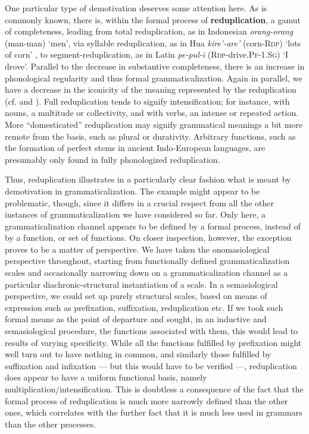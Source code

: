 One particular type of demotivation deserves some attention here. As is commonly known, there is, within the formal process of \textbf{reduplication}, a gamut of completeness, leading from total reduplication, as in Indonesian \textit{orang-orang} (man-man) ‘men’, via syllable reduplication, as in Hua \textit{kire'-are'} (corn-\textsc{Rdp}) ‘lots of corn’ \citep[222]{Haiman1980}, to segment-reduplication, as in Latin \textit{pe-pul-i} (\textsc{Rdp}{}-drive.\textsc{Pf-1.Sg}) ‘I drove’. Parallel to the decrease in substantive completeness, there is an increase in phonological regularity and thus formal grammaticalization. Again in parallel, we have a decrease in the iconicity of the meaning represented by the reduplication (cf. \citet{André1978} and \citet[46-48]{HeineEtAl1984} ). Full reduplication tends to signify intensification; for instance, with nouns, a multitude or collectivity, and with verbs, an intense or repeated action. More “domesticated” reduplication may signify grammatical meanings a bit more remote from the basis, such as plural or durativity. Arbitrary functions, such as the formation of perfect stems in ancient Indo-European languages, are presumably only found in fully phonologized reduplication.

Thus, reduplication illustrates in a particularly clear fashion what is meant by demotivation in grammaticalization. The example might appear to be problematic, though, since it differs in a crucial respect from all the other instances of grammaticalization we have considered so far. Only here, a grammaticalization channel appears to be defined by a formal process, instead of by a function, or set of functions. On closer inspection, however, the exception proves to be a matter of perspective. We have taken the onomasiological perspective throughout, starting from functionally defined grammaticalization scales and occasionally narrowing down on a grammaticalization channel as a particular diachronic-structural instantiation of a scale. In a semasiological perspective, we could set up purely structural scales, based on means of expression such as prefixation, suffixation, reduplication etc. If we took such formal means as the point of departure and sought, in an inductive and semasiological procedure, the functions associated with them, this would lead to results of varying specificity. While all the functions fulfilled by prefixation might well turn out to have nothing in common, and similarly those fulfilled by suffixation and infixation — but this would have to be verified —, reduplication does appear to have a uniform functional basis, namely multiplication/intensification. This is doubtless a consequence of the fact that the formal process of reduplication is much more narrowly defined than the other ones, which correlates with the further fact that it is much less used in grammars than the other processes.

